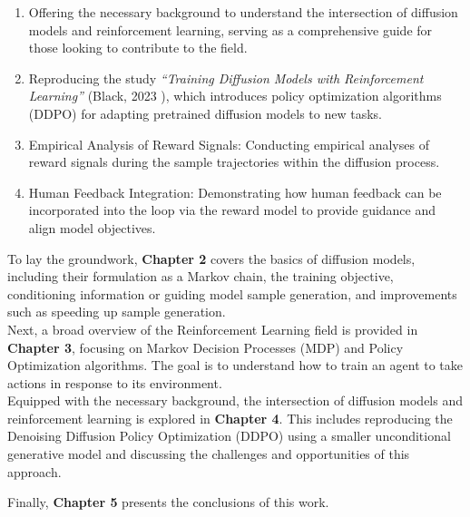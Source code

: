 \begin{enumerate}
    \item Offering the necessary background to understand the intersection of diffusion models and reinforcement learning, serving as a comprehensive guide for those looking to contribute to the field.
    \item Reproducing the study \textit{``Training Diffusion Models with Reinforcement Learning''} (Black, 2023 \cite{black2023training}), which introduces policy optimization algorithms (DDPO) for adapting pretrained diffusion models to new tasks.
    \item Empirical Analysis of Reward Signals: Conducting empirical analyses of reward signals during the sample trajectories within the diffusion process.
    \item Human Feedback Integration: Demonstrating how human feedback can be incorporated into the loop via the reward model to provide guidance and align model objectives.
\end{enumerate}

\noindent To lay the groundwork, \textbf{Chapter 2} covers the basics of diffusion models, including their formulation as a Markov chain, the training objective, conditioning information or guiding model sample generation, and improvements such as speeding up sample generation. \\

\noindent Next, a broad overview of the Reinforcement Learning field is provided in \textbf{Chapter 3}, focusing on Markov Decision Processes (MDP) and Policy Optimization algorithms. The goal is to understand how to train an agent to take actions in response to its environment. \\

\noindent Equipped with the necessary background, the intersection of diffusion models and reinforcement learning is explored in \textbf{Chapter 4}. This includes reproducing the Denoising Diffusion Policy Optimization (DDPO) \cite{black2023training} using a smaller unconditional generative model and discussing the challenges and opportunities of this approach. 


\noindent Finally, \textbf{Chapter 5} presents the conclusions of this work. 